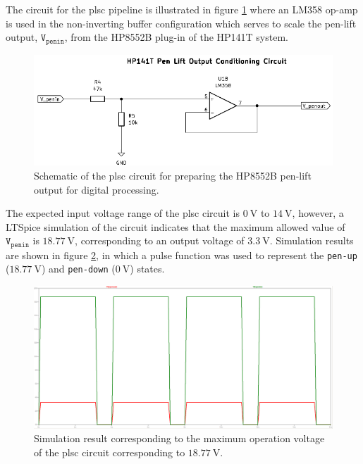 \documentclass[class=report,11pt,crop=false]{standalone}
\begin{document}
	The circuit for the \acrlong{plsc} pipeline is illustrated in figure \ref{fig:sig-cond-plsc-schematic} where an LM358 op-amp is used in the non-inverting buffer configuration which serves to scale the pen-lift output, $\texttt{V}_\texttt{penin}$, from the HP8552B plug-in of the HP141T system. 
	
	\begin{figure}[h!]
		\centering
		\includegraphics[width=0.7\linewidth]{Figures/Methodology/sig-cond-plsc-schematic}
		\caption{Schematic of the \acrshort{plsc} circuit for preparing the HP8552B pen-lift output for digital processing.}
		\label{fig:sig-cond-plsc-schematic}
	\end{figure}  
	
	The expected input voltage range of the \acrshort{plsc} circuit is $\SI{0}{\volt}$ to $\SI{14}{\volt}$, however, a LTSpice simulation of the circuit indicates that the maximum allowed value of $\texttt{V}_\texttt{penin}$ is $\SI{18.77}{\volt}$, corresponding to an output voltage of $\SI{3.3}{\volt}$. Simulation results are shown in figure \ref{fig:sig-cond-plsc-sim-output-1877V}, in which a pulse function was used to represent the \texttt{pen-up} ($\SI{18.77}{\volt}$) and \texttt{pen-down} ($\SI{0}{\volt}$) states. 
	
	\begin{figure}[h!]
		\centering
		\includegraphics[width=0.7\linewidth]{Figures/Methodology/sig-cond-plsc-sim-output-1877V}
		\caption{Simulation result corresponding to the maximum operation voltage of the \acrshort{plsc} circuit corresponding to $\SI{18.77}{\volt}$.}
		\label{fig:sig-cond-plsc-sim-output-1877V}
	\end{figure}
\end{document}
